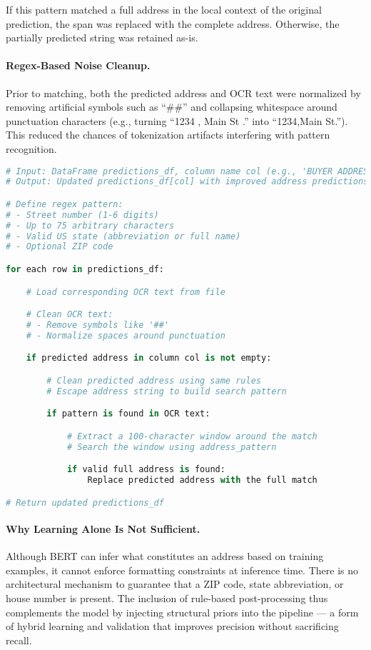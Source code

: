 \documentclass{article}
\begin{document}
If this pattern matched a full address in the local context of the original prediction, the span was replaced with the complete address. Otherwise, the partially predicted string was retained as-is.

\paragraph{Regex-Based Noise Cleanup.}
Prior to matching, both the predicted address and OCR text were normalized by removing artificial symbols such as ``\#\#'' and collapsing whitespace around punctuation characters (e.g., turning ``1234 , Main St .'' into ``1234,Main St.''). This reduced the chances of tokenization artifacts interfering with pattern recognition.

\begin{lstlisting}[language=Python, caption=Normalize Extracted Address Using Context-Aware Regex]
# Input: DataFrame predictions_df, column name col (e.g., 'BUYER ADDRESS')
# Output: Updated predictions_df[col] with improved address predictions

# Define regex pattern:
# - Street number (1-6 digits)
# - Up to 75 arbitrary characters
# - Valid US state (abbreviation or full name)
# - Optional ZIP code

for each row in predictions_df:

    # Load corresponding OCR text from file

    # Clean OCR text:
    # - Remove symbols like '##'
    # - Normalize spaces around punctuation

    if predicted address in column col is not empty:

        # Clean predicted address using same rules
        # Escape address string to build search pattern

        if pattern is found in OCR text:

            # Extract a 100-character window around the match
            # Search the window using address_pattern

            if valid full address is found:
                Replace predicted address with the full match

# Return updated predictions_df
\end{lstlisting}



\paragraph{Why Learning Alone Is Not Sufficient.}
Although BERT can infer what constitutes an address based on training examples, it cannot enforce formatting constraints at inference time. \cite{chiticariu2010systemt} There is no architectural mechanism to guarantee that a ZIP code, state abbreviation, or house number is present. The inclusion of rule-based post-processing thus complements the model by injecting structural priors into the pipeline — a form of hybrid learning and validation that improves precision without sacrificing recall.
\end{document}
